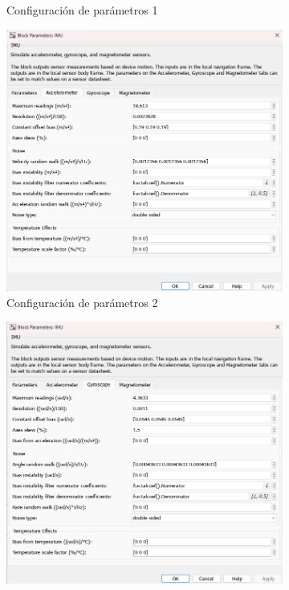 \begin{figure}[htbp]
\begin{subfigure}[b]{0.45\textwidth}
        \caption{Configuración de parámetros 1}
        \label{fig:parametros_IMU_01}
    \end{subfigure}
    \hfill
    \begin{subfigure}[b]{0.45\textwidth}
        \centering
        \includegraphics[width=\textwidth]{fig/Capitulo5/Caso_de_estudio_IMU/Generador_de_archivos/configuracion_parametros_IMU_02.png}
        \caption{Configuración de parámetros 2}
        \label{fig:parametros_IMU_02}
    \end{subfigure}
    \hfill
    \begin{subfigure}[b]{0.45\textwidth}
        \centering
        \includegraphics[width=\textwidth]{fig/Capitulo5/Caso_de_estudio_IMU/Generador_de_archivos/configuracion_parametros_IMU_03.png}

\end{subfigure}
\end{figure}
